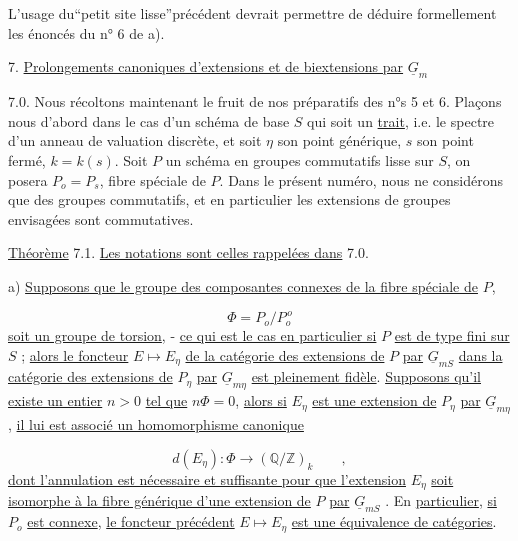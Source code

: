 L'usage du``petit site lisse''précédent devrait permettre de déduire formellement les énoncés du n° 6 de a).




7. \underline{Prolongements canoniques d'extensions et de biextensions par} $\underline{G}_m$

7.0. Nous récoltons maintenant le fruit de nos préparatifs des n°s 5 et 6. Plaçons nous d'abord dans le cas d'un schéma de base $S$ qui soit un \underline{trait}, i.e. le spectre d'un anneau de valuation discrète, et soit $\eta$ son point générique, $s$ son point fermé, $k = k(s)$. Soit $P$ un schéma en groupes commutatifs lisse sur $S$, on posera $P_o = P_s$, fibre spéciale de $P$. Dans le présent numéro, nous ne considérons que des groupes commutatifs, et en particulier les extensions de groupes envisagées sont commutatives.

\underline{Théorème} 7.1. \underline{Les notations sont celles rappelées dans} 7.0.

a) \underline{Supposons que le groupe des composantes connexes de la fibre spéciale de} $P$,

\begin{equation*}
\Phi = P_o/P_o^{\,o}
\end{equation*}
\underline{soit un groupe de torsion}, - \underline{ce qui est le cas en particulier si} $P$ \underline{est de type fini sur} $S$ ; \underline{alors le foncteur} $E \longmapsto E_\eta$ \underline{de la catégorie des extensions de} $P$ \underline{par} $\underline{G}_{mS}$ \underline{dans la catégorie des extensions de} $P_\eta$ \underline{par} $\underline{G}_{m\eta}$ \underline{est pleinement fidèle}. \underline{Supposons qu'il existe un entier} $n > 0$ \underline{tel que} $n\Phi = 0$, \underline{alors si} $E_\eta$ \underline{est une extension de} $P_\eta$ \underline{par} $\underline{G}_{m\eta}$ , \underline{il lui est associé un homomorphisme canonique}

\begin{equation}\tag{7.1.1}
d(E_\eta) : \Phi \longrightarrow (\mathbb{Q}/\mathbb{Z})_k \qquad ,
\end{equation}
\underline{dont l'annulation est nécessaire et suffisante pour que l'extension} $E_\eta$ \underline{soit isomorphe à la fibre générique d'une extension de} $P$ \underline{par} $\underline{G}_{mS}$ . En \underline{particulier}, \underline{si} $P_o$ \underline{est connexe}, \underline{le foncteur précédent} $E \longmapsto E_\eta$ \underline{est une équivalence de catégories}.


